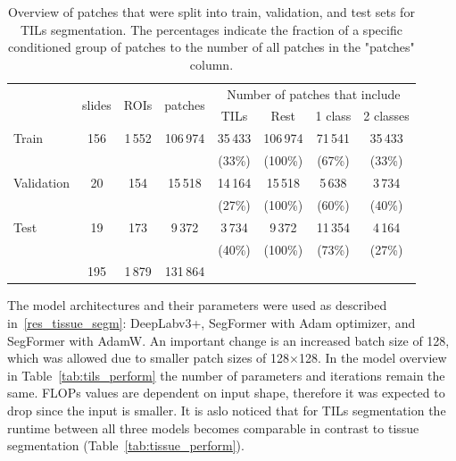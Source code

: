 \begin{table}[h!]
    \centering
    \begin{tabular}{ l c c c c c c c }
        \hline
        & \multirow{2}{*}{slides} & \multirow{2}{*}{ROIs}& \multirow{2}{*}{patches}& \multicolumn{4}{c}{Number of patches that include}\\ 
        \cline{5-8}
        & & & & TILs & Rest & 1 class & 2 classes \\
        \hline
        Train & 156 & 1\,552 & 106\,974 & 35\,433 & 106\,974 & 71\,541 & 35\,433\\
         &  &  &  & (33\%) & (100\%) & (67\%) & (33\%)  \\
        Validation & 20 & 154 & 15\,518 & 14\,164 & 15\,518 & 5\,638 & 3\,734 \\
         &  &  &  & (27\%) & (100\%) & (60\%) & (40\%)\\
        Test & 19 & 173 & 9\,372 & 3\,734 & 9\,372& 11\,354 & 4\,164\\
         &  &  &  & (40\%) & (100\%) & (73\%) & (27\%)\\
        \hline
        & 195 & 1\,879 & 131\,864 &  &  &  & \\
    \end{tabular}
    \caption{\label{tab:patch_sep_tils} Overview of patches that were split into train, validation,
    and test sets for TILs segmentation. The percentages indicate the fraction of a specific conditioned
    group of patches to the number of all patches in the "patches" column.}
\end{table}

The model architectures and their parameters were used as described in~\ref*{res_tissue_segm}:
DeepLabv3+, SegFormer with Adam optimizer, and SegFormer with AdamW. An important
change is an increased batch size of 128, which was allowed due to smaller patch
sizes of 128$\times$128. In the model overview in Table~\ref*{tab:tils_perform}
the number of parameters and
iterations remain the same. FLOPs values are dependent on input shape, therefore
it was expected to drop since the input is smaller.
It is aslo noticed that for TILs segmentation the runtime between all three models
becomes comparable in contrast to tissue segmentation (Table~\ref*{tab:tissue_perform}).

